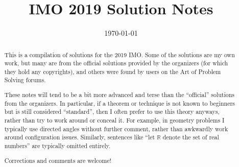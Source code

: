 \documentclass[11pt]{scrartcl}
\title{IMO 2019 Solution Notes}
\date{\today}
\begin{document}
\maketitle

\begin{abstract}
This is a compilation of solutions
for the 2019 IMO.
Some of the solutions are my own work,
but many are from the official solutions provided by the organizers
(for which they hold any copyrights),
and others were found by users on the Art of Problem Solving forums.

These notes will tend to be a bit more advanced and terse than the ``official''
solutions from the organizers.
In particular, if a theorem or technique is not known to beginners
but is still considered ``standard'', then I often prefer to
use this theory anyways, rather than try to work around or conceal it.
For example, in geometry problems I typically use directed angles
without further comment, rather than awkwardly work around configuration issues.
Similarly, sentences like ``let $\mathbb{R}$ denote the set of real numbers''
are typically omitted entirely.

Corrections and comments are welcome!
\end{abstract}

\tableofcontents
\newpage

\addtocounter{section}{-1}
\end{document}
